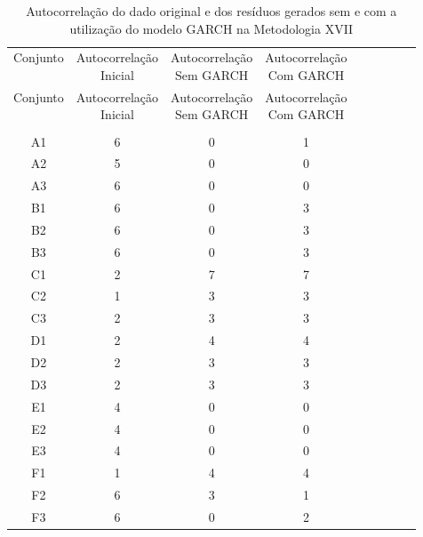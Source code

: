 \begin{center}
\begin{longtable}{ccccc|cccc}
\toprule
\rowcolor{white}
\caption[Metodologia XVII: evolução da autocorrelação]{Autocorrelação do dado
original e dos resíduos gerados sem e com a utilização do modelo GARCH na
Metodologia XVII} \label{tab:EvolucaoAutocorrelacaoMet17}\\
\midrule
Conjunto & \specialcell{Autocorrelação\\Inicial} & \specialcell{Autocorrelação\\Sem
GARCH} & \specialcell{Autocorrelação\\Com GARCH} \\
\midrule
\endfirsthead 
\midrule
\rowcolor{white}
Conjunto & \specialcell{Autocorrelação\\Inicial} & \specialcell{Autocorrelação\\Sem
GARCH} & \specialcell{Autocorrelação\\Com GARCH} \\
\toprule
\endhead
\midrule \\ %
\endfoot
\bottomrule 
\endlastfoot
A1    & 6     & 0     & 1 \\
A2    & 5     & 0     & 0 \\
A3    & 6     & 0     & 0 \\
B1    & 6     & 0     & 3 \\
B2    & 6     & 0     & 3 \\
B3    & 6     & 0     & 3 \\
C1    & 2     & 7     & 7 \\
C2    & 1     & 3     & 3 \\
C3    & 2     & 3     & 3 \\
D1    & 2     & 4     & 4 \\
D2    & 2     & 3     & 3 \\
D3    & 2     & 3     & 3 \\
E1    & 4     & 0     & 0 \\
E2    & 4     & 0     & 0 \\
E3    & 4     & 0     & 0 \\
F1    & 1     & 4     & 4 \\
F2    & 6     & 3     & 1 \\
F3    & 6     & 0     & 2 \\

\end{longtable}
\end{center}
